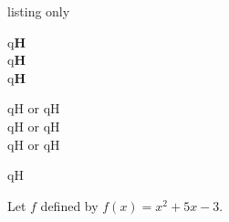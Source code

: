 \documentclass[11pt,a4paper]{ltxdoc}
\begin{document}
\begin{DemoCode}{listing only}

\end{DemoCode}

\begin{DemoCode}{}
{q\LARGE\sffamily\bfseries{}H}\\
{q\LARGE\sffamily\bfseries{}H}\\
{q\LARGE\sffamily\bfseries{}H}
\end{DemoCode}

\begin{DemoCode}{}
{\Huge qH or qH}\\
{\Huge qH or qH}\\
{\Huge qH or qH }
\end{DemoCode}

\begin{DemoCode}{}
{\Huge\sffamily qH}
\end{DemoCode}

\begin{DemoCode}{}
 Let $f$ defined by $f(x)=x^{2}+5x-3$.
\end{DemoCode}
\end{document}
